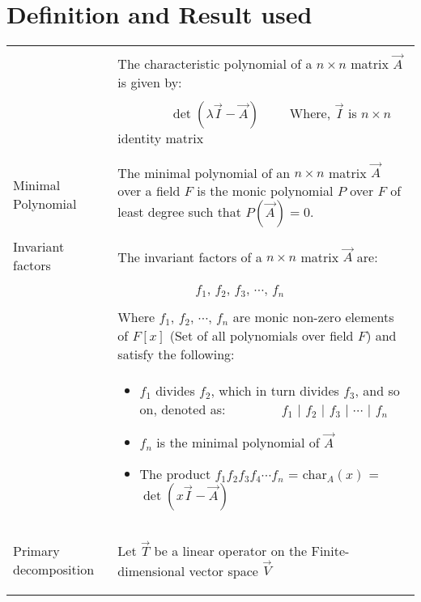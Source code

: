 \documentclass[journal,12pt]{IEEEtran}
\begin{document}
\section{\textbf{Definition and Result used}}
\begin{longtable}{|p{4.5cm}|p{13.5cm}|}
	\hline
	    &\\
		\endhead
		&\\
		\hline
		\endfoot
	\multirow{3}{*}{Characteristic Polynomial} 
	& The characteristic polynomial of a $n \times n$ matrix $\vec{A}$ is given by:\\
	&\\
	& $\qquad\qquad\boxed{\det(\lambda\vec{ I}-\vec{A})} \qquad$ Where, $\vec{I}$ is $n\times n$ identity matrix  \\
	&\\
	\hline
	\multirow{3}{*}{Minimal Polynomial} 
	& \\
	& The minimal polynomial of an $n \times n$ matrix $\vec{A}$ over a field $F$ is the monic polynomial $P$ over $F$ of least degree such that $P(\vec{A}) = 0$.\\
	&\\
	\hline
	\multirow{3}{*}{Invariant factors} & \\
	& The invariant factors of a $n\times n$ matrix $\vec{A}$ are: \\
    & \\
    &$\qquad\qquad\qquad f_1$, $f_2$, $f_3$, $\cdots$, $f_n$\\
    &\\
    &Where $f_1$, $f_2$, $\cdots$, $f_n$ are monic non-zero elements of $F[x]$ (Set of all polynomials over field $F$) and satisfy the following:\\
    &\begin{itemize}
        \item $f_1$ divides $f_2$, which in turn divides $f_3$, and so on, denoted as: \newline
        $\qquad \qquad f_1$ $|$ $f_2$ $|$ $f_3$ $|$ $\cdots$ $|$ $f_n$
        \item $f_n$ is the minimal polynomial of $\vec{A}$
        \item The product $f_1f_2f_3f_4\cdots f_n$ = char$_A(x)$ =$\det(x\vec{I}-\vec{A})$
    \end{itemize}\\
    \hline
    \multirow{3}{*}{\hypertarget{pdt}{Primary decomposition}} & \\
	& Let $\vec{T}$ be a linear operator on the Finite-dimensional vector space $\vec{V}$ \\ theorem

\end{longtable}
\end{document}
